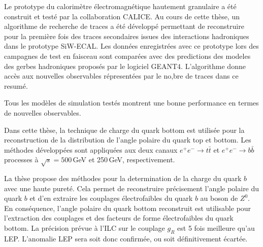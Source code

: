Le prototype du calorim\`etre \'electromagn\'etique hautement granulaire a été construit et testé par la collaboration CALICE.
Au cours de cette thèse, un algorithme de recherche de traces a été développé permettant de reconstruire pour la première fois des traces secondaires issues des interactions hadroniques dans le prototype SiW-ECAL.
Les données enregistrées avec ce prototype lors des campagnes de test en faisceau sont comparées avec des predictions des modeles des gerbes hadroniques proposés par le logiciel GEANT4. L'algorithme donne accès aux nouvelles observables répresentées par le no,bre de traces dans ce resumé. 


Tous les modèles de simulation testés montrent une bonne performance en termes de nouvelles observables.

Dans cette thèse, la technique de charge du quark bottom est utilisée pour la reconstruction de la distribution de l'angle polaire du quark top et bottom.
Les méthodes développées sont appliquées aux deux canaux $e^+ e^- \to t\bar{t}$ et $e^+ e^- \to b\bar{b}$ processes à $\sqrt {s} = 500$\,GeV et 250\,GeV, respectivement.

La thèse propose des méthodes pour la determination de la charge du quark $b$ avec une haute pureté. Cela permet de reconstruire précisement l'angle polaire du quark $b$ et d'en extraire les couplages électrofaibles du quark $b$ au boson de $Z^0$.%
En conséquence, l'angle polaire du quark bottom reconstruit est utilisable pour l'extraction des couplages  et des facteurs de forme électrofaibles du quark bottom.
La précision prévue à l'ILC sur le couplage $g_R$ est 5 fois meilleure qu'au LEP. L'anomalie LEP sera soit donc confirmée, ou soit définitivement écartée.


